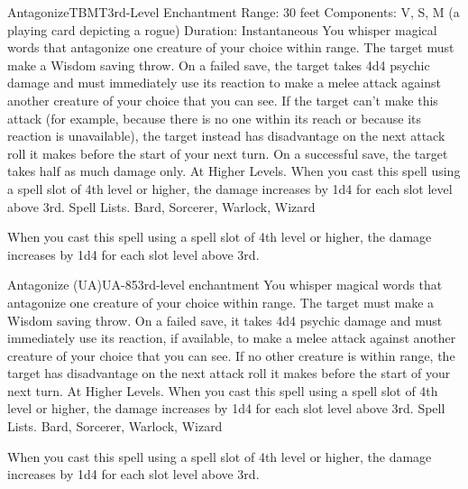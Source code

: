 \begin{spell}{Antagonize}{TBMT}{3rd-Level Enchantment}
{
}
Range: 30 feet
Components: V, S, M (a playing card depicting a rogue)
Duration: Instantaneous
You whisper magical words that antagonize one creature of your choice within range. The target must make a Wisdom saving throw. On a failed save, the target takes 4d4 psychic damage and must immediately use its reaction to make a melee attack against another creature of your choice that you can see. If the target can’t make this attack (for example, because there is no one within its reach or because its reaction is unavailable), the target instead has disadvantage on the next attack roll it makes before the start of your next turn. On a successful save, the target takes half as much damage only.
At Higher Levels. When you cast this spell using a spell slot of 4th level or higher, the damage increases by 1d4 for each slot level above 3rd.
Spell Lists. Bard, Sorcerer, Warlock, Wizard

 When you cast this spell using a spell slot of 4th level or higher, the damage increases by 1d4 for each slot level above 3rd.
\end{spell}

\begin{spell}{Antagonize (UA)}{UA-85}{3rd-level enchantment}
{
}
You whisper magical words that antagonize one creature of your choice within range. The target must make a Wisdom saving throw. On a failed save, it takes 4d4 psychic damage and must immediately use its reaction, if available, to make a melee attack against another creature of your choice that you can see. If no other creature is within range, the target has disadvantage on the next attack roll it makes before the start of your next turn.
At Higher Levels. When you cast this spell using a spell slot of 4th level or higher, the damage increases by 1d4 for each slot level above 3rd.
Spell Lists. Bard, Sorcerer, Warlock, Wizard

 When you cast this spell using a spell slot of 4th level or higher, the damage increases by 1d4 for each slot level above 3rd.
\end{spell}

